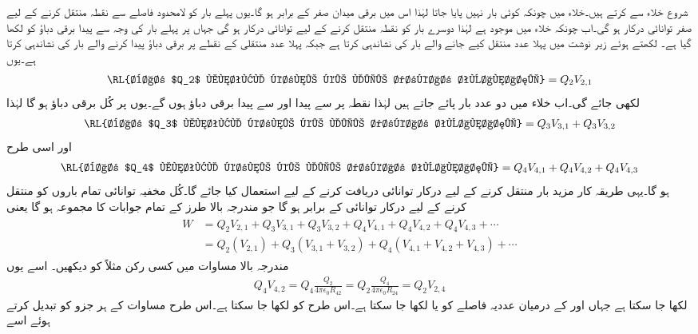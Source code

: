 شروع خلاء سے کرتے ہیں۔خلاء میں چونکہ کوئی بار نہیں پایا جاتا لہٰذا اس میں برقی میدان صفر کے برابر ہو گا۔یوں پہلے بار  کو لامحدود فاصلے سے  نقطہ  منتقل کرنے کے لیے صفر توانائی درکار ہو گی۔اب چونکہ خلاء میں  موجود ہے لہٰذا دوسرے بار  کو  نقطہ  منتقل کرنے کے لیے  توانائی درکار ہو گی جہاں  پر پہلے بار کی وجہ سے پیدا برقی دباؤ کو  لکھا گیا ہے۔ لکھتے ہوئے زیر نوشت میں پہلا عدد منتقل کیے جانے والے بار کی نشاندہی کرتا ہے جبکہ پہلا عدد  منتقلی کے نقطے پر برقی دباؤ پیدا کرنے والے بار کی نشاندہی کرتا ہے۔یوں
\begin{align*}
\textup{\RL{بار $Q_2$ منتقل کرنے کے لیے درکار توانائی}}=Q_2 V_{2,1}
\end{align*}
لکھی جائے گی۔اب خلاء میں دو عدد بار پائے جاتے ہیں لہٰذا  نقطہ  پر  سے پیدا  اور  سے پیدا  برقی دباؤ ہوں گے۔یوں  پر کُل  برقی دباؤ ہو گا لہٰذا
\begin{align*}
\textup{\RL{بار $Q_3$ منتقل کرنے کے لیے درکار توانائی}}=Q_3 V_{3,1} +Q_3 V_{3,2}
\end{align*}
اور اسی طرح
\begin{align*}
\textup{\RL{بار $Q_4$ منتقل کرنے کے لیے درکار توانائی}}=Q_4 V_{4,1} +Q_4 V_{4,2}+Q_4 V_{4,3}
\end{align*}
ہو گا۔یہی طریقہ کار مزید بار منتقل کرنے کے لیے درکار توانائی دریافت کرنے کے لیے استعمال کیا جائے گا۔کُل مخفیہ توانائی  تمام باروں کو منتقل کرنے کے لیے درکار توانائی کے برابر ہو گا جو مندرجہ بالا طرز کے تمام جوابات کا مجموعہ ہو گا یعنی
\begin{gather}
\begin{aligned}\label{مساوات_توانائی_بار_کثافت_توانائی_الف}
W&=Q_2 V_{2,1}+Q_3 V_{3,1} +Q_3 V_{3,2}+Q_4 V_{4,1} +Q_4 V_{4,2}+Q_4 V_{4,3}+\cdots\\
&=Q_2(V_{2,1})+Q_3( V_{3,1}+V_{3,2})+Q_4(V_{4,1} +V_{4,2}+V_{4,3})+\cdots
\end{aligned}
\end{gather}
مندرجہ بالا مساوات میں کسی رکن مثلاً  کو دیکھیں۔ اسے یوں
\begin{align*}
Q_4 V_{4,2} = Q_4 \frac{Q_2}{4\pi \epsilon_0 R_{42}}= Q_2 \frac{Q_4}{4\pi \epsilon_0 R_{24}}= Q_2 V_{2,4}
\end{align*}
 لکھا جا سکتا ہے جہاں  اور  کے درمیان عددیہ فاصلے کو  یا  لکھا جا سکتا ہے۔اس طرح  کو  لکھا جا سکتا ہے۔اس طرح مساوات  کے ہر جزو کو تبدیل کرتے ہوئے اسے
